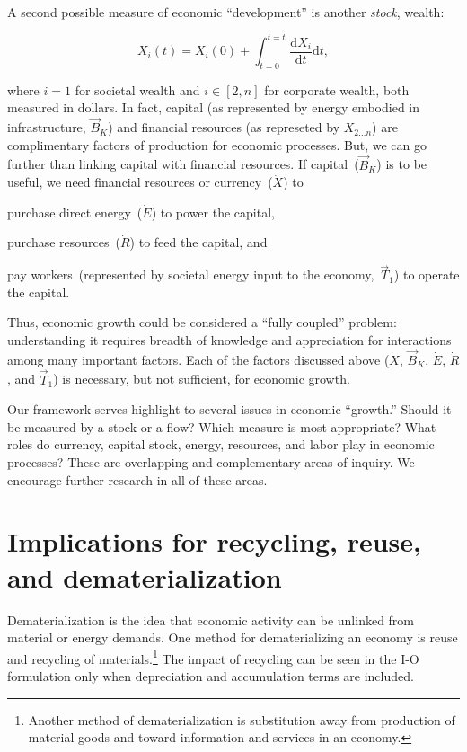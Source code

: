 A second possible measure of economic ``development'' is another \emph{stock}, 
wealth:

\begin{equation} \label{eq:Dev_Integral_Wealth}
	X_{i}(t) 
	= X_{i}(0) 
	+ \int_{t=0}^{t=t} \frac{\mathrm{d}X_{i}}{\mathrm{d}t}\mathrm{d}t,
\end{equation}

\noindent{}where $i=1$ for societal wealth 
and $i \in [2,n]$ for corporate wealth, both measured in dollars.
In fact, capital (as represented by energy embodied in infrastructure, $\vec{B}_{K}$) and 
financial resources (as represeted by $X_{2 \ldots n}$) 
are complimentary factors of production for economic processes. 
But, we can go further than linking capital with financial resources.
If capital~($\vec{B}_{K}$) is to be useful, we need financial resources
or currency~($\dot{X}$) to 
\begin{itemize}
	\item{purchase direct energy~($\dot{E}$) to power the capital,
	\item{purchase resources~($\dot{R}$) to feed the capital, and}
	\item{pay workers~(represented 
	by societal energy input to the economy,~$\vec{T}_{1}$) 
	to operate the capital.}
} 
\end{itemize}

Thus, economic growth could be considered a ``fully coupled'' problem:
understanding it requires breadth of knowledge and appreciation for 
interactions among many important factors.
Each of the factors discussed above 
($\dot{X}$, $\vec{B}_{K}$, $\dot{E}$, $\dot{R}$, and $\vec{T}_{1}$)
is necessary, but not sufficient, for economic growth.

Our framework serves highlight to several issues in economic ``growth.'' 
Should it be measured by a stock or a flow? 
Which measure is most appropriate? 
What roles do currency, capital stock, energy, resources, and labor
play in economic processes?
These are overlapping and complementary areas of inquiry.
We encourage further research in all of these areas.


\section{Implications for recycling, reuse, and dematerialization}
\label{sec:recycling}

Dematerialization is the idea that economic activity can be unlinked 
from material or energy demands.\cite{FischerKowalski:2011uo} 
One method for dematerializing an economy 
is reuse and recycling of materials.\footnote{Another method 
of dematerialization is 
substitution away from production of material goods 
and toward information and services
in an economy.}
The impact of recycling can be seen in the I-O formulation 
only when depreciation and accumulation terms are included. 

